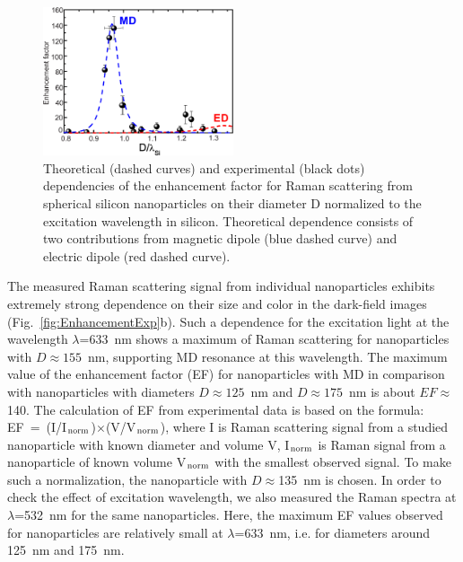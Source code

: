         \begin{figure}[!hb]
            \begin{center}
                \includegraphics[width=0.5\textwidth]{figs/results/enhance/EnhancementExperimentTheory.eps}
            \end{center}
            \caption{Theoretical (dashed curves) and experimental (black dots) dependencies of the enhancement factor for Raman
            scattering from spherical silicon nanoparticles on their diameter D normalized to the excitation wavelength in silicon.
            Theoretical dependence consists of two contributions from magnetic dipole (blue dashed curve) and electric dipole
            (red dashed curve).}
            \label{fig:EnhancementExpTheory}
        \end{figure}

        The measured Raman scattering signal from individual nanoparticles exhibits extremely strong dependence on their size
        and color in the dark-field images (Fig.~\ref{fig:EnhancementExp}b). Such a dependence for the excitation light at the wavelength
        $\lambda$=633~nm shows a maximum of Raman scattering for nanoparticles with $D\approx 155$~nm, supporting MD resonance
        at this wavelength. The maximum value of the enhancement factor (EF) for nanoparticles with MD in comparison with
        nanoparticles with diameters $D\approx125$~nm and $D\approx175$~nm is about $EF\approx$140. The calculation of EF
        from experimental data is based on the formula: EF~=~(I/I$_{\rm norm}$)$\times$(V/V$_{\rm norm}$), where I is Raman
        scattering signal from a studied nanoparticle with known diameter and volume V, I$_{\rm norm}$ is Raman signal from
        a nanoparticle of known volume V$_{\rm norm}$ with the smallest observed signal. To make such a normalization, the
        nanoparticle with $D\approx$135~nm is chosen. In order to check the effect of excitation wavelength, we also measured
        the Raman spectra at $\lambda$=532~nm for the same nanoparticles. Here, the maximum EF values observed for nanoparticles
         are relatively small at $\lambda$=633~nm, i.e. for diameters around 125~nm and 175~nm.

